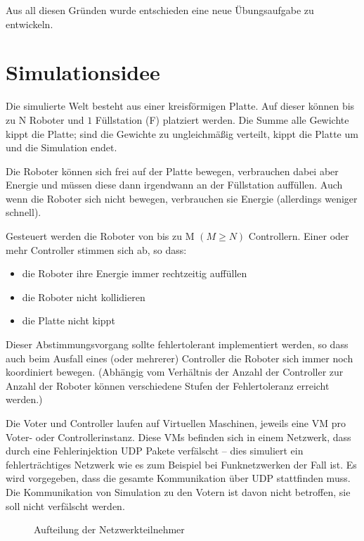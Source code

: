 Aus all diesen Gr{\"{u}}nden wurde entschieden eine neue {\"{U}}bungsaufgabe zu entwickeln.

\clearpage
\section{Simulationsidee}
Die simulierte Welt besteht aus einer kreisf{\"{o}}rmigen Platte. Auf dieser k{\"{o}}nnen bis zu \gls{N} Roboter und $1$ F{\"{u}}llstation (\gls{F})
platziert werden. Die Summe alle Gewichte kippt die Platte; sind die Gewichte zu ungleichm{\"{a}}{\ss}ig verteilt, kippt
die Platte um und die Simulation endet.

Die Roboter k{\"{o}}nnen sich frei auf der Platte bewegen, verbrauchen dabei aber Energie und m{\"{u}}ssen diese dann irgendwann
an der F{\"{u}}llstation auff{\"{u}}llen. Auch wenn die Roboter sich nicht bewegen, verbrauchen sie Energie (allerdings weniger
schnell).

Gesteuert werden die Roboter von bis zu \gls{M} $(M \geq N)$ Controllern. Einer oder mehr Controller stimmen sich ab,
so dass:
\begin{itemize}
\item die Roboter ihre Energie immer rechtzeitig auff{\"{u}}llen
\item die Roboter nicht kollidieren
\item die Platte nicht kippt
\end{itemize}

Dieser Abstimmungsvorgang sollte fehlertolerant implementiert werden, so dass auch beim Ausfall eines (oder mehrerer) Controller die Roboter sich immer noch koordiniert bewegen.
(Abh{\"{a}}ngig vom Verh{\"{a}}ltnis der Anzahl der Controller zur Anzahl der Roboter k{\"{o}}nnen verschiedene Stufen der Fehlertoleranz erreicht werden.\cite[s.149]{Werner00})

Die Voter und Controller laufen auf Virtuellen Maschinen, jeweils eine VM pro Voter- oder Controllerinstanz.
Diese VMs befinden sich in einem Netzwerk, dass durch eine Fehlerinjektion UDP Pakete verf{\"{a}}lscht -- dies simuliert ein fehlertr{\"{a}}chtiges Netzwerk wie es zum Beispiel bei Funknetzwerken der Fall ist.
Es wird vorgegeben, dass die gesamte Kommunikation {\"{u}}ber UDP stattfinden muss. Die Kommunikation von Simulation zu den Votern ist davon nicht betroffen, sie soll nicht verf{\"{a}}lscht werden.

\begin{figure}
	\centering
	\caption{Aufteilung der Netzwerkteilnehmer}
	\label{fig:network}
\end{figure}

